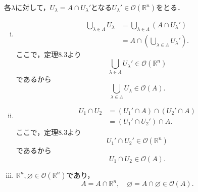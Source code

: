 \begin{tproof}
    各$\lambda$に対して，$U_\lambda= A \cap U_\lambda '$となる$ U_\lambda ' \in \mathcal{O} (\mathbb{R}^n)$をとる．
    \begin{enumerate}[(i)]
        \item
              \begin{align*}
                  \bigcup_{\lambda \in \Lambda} U_\lambda & = \bigcup_{\lambda \in \Lambda} (A \cap U_\lambda ')  \\
                                                          & = A \cap (\bigcup_{\lambda \in \Lambda} U_\lambda ').
              \end{align*}
              ここで，定理8.3より
              \[
                  \bigcup_{\lambda \in \Lambda} U_\lambda ' \in \mathcal{O} (\mathbb{R}^n)
              \]
              であるから
              \[
                  \bigcup_{\lambda \in \Lambda} U_\lambda \in \mathcal{O} (A).
              \]
        \item
              \begin{align*}
                  U_1 \cap U_2 & = (U_1 ' \cap A) \cap (U_2 ' \cap A) \\
                               & = (U_1 ' \cap U_2 ') \cap A.
              \end{align*}
              ここで，定理8.3より
              \[
                  U_1 ' \cap U_2 ' \in \mathcal{O} (\mathbb{R}^n)
              \]
              であるから
              \[
                  U_1 \cap U_2 \in \mathcal{O} (A).
              \]
        \item
              $\mathbb{R}^n, \varnothing \in \mathcal{O} (\mathbb{R}^n)$であり，
              \[
                  A = A \cap \mathbb{R}^n, \quad \varnothing = A \cap \varnothing \in \mathcal{O} (A).
              \]
    \end{enumerate}
\end{tproof}



